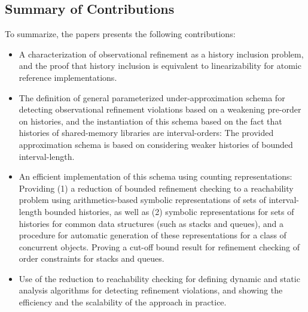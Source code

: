 \subsection{Summary of Contributions}

To summarize, the papers presents the following contributions:
\begin{itemize}

  \item A characterization of observational refinement as a history inclusion
  problem, and the proof that history inclusion is equivalent to
  linearizability for atomic reference implementations.

  \item The definition of general parameterized under-approximation schema for
  detecting observational refinement violations based on a weakening pre-order
  on histories, and the instantiation of this schema based on the fact that
  histories of shared-memory libraries are interval-orders: The provided
  approximation schema is based on considering weaker histories of bounded
  interval-length.

  \item An efficient implementation of this schema using counting
  representations: Providing (1) a reduction of bounded refinement checking to
  a reachability problem using arithmetics-based symbolic representations of
  sets of interval-length bounded histories, as well as (2) symbolic
  representations for sets of histories for common data structures (such as
  stacks and queues), and a procedure for automatic generation of these
  representations for a class of concurrent objects. Proving a cut-off bound
  result for refinement checking of order constraints for stacks and queues.

  \item Use of the reduction to reachability checking for defining dynamic and
  static analysis algorithms for detecting refinement violations, and showing
  the efficiency and the scalability of the approach in practice.

\end{itemize}
